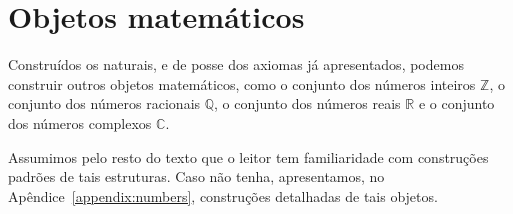 \section{Objetos matemáticos}\label{sec:objetosMatematicos}

Construídos os naturais, e de posse dos axiomas já apresentados, podemos construir outros objetos matemáticos, como o conjunto dos números inteiros $\mathbb Z$, o conjunto dos números racionais $\mathbb Q$, o conjunto dos números reais $\mathbb R$ e o conjunto dos números complexos $\mathbb C$.

Assumimos pelo resto do texto que o leitor tem familiaridade com construções padrões de tais estruturas.
Caso não tenha, apresentamos, no Apêndice~\ref{appendix:numbers}, construções detalhadas de tais objetos.
